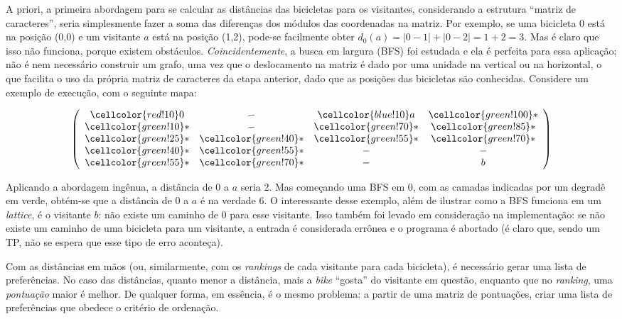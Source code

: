 \documentclass{article}
\newcommand\bl{\cellcolor{blue!10}}
\newcommand\re{\cellcolor{red!10}}
\newcommand\ga{\cellcolor{green!10}}
\newcommand\gb{\cellcolor{green!25}}
\newcommand\gc{\cellcolor{green!40}}
\newcommand\gd{\cellcolor{green!55}}
\newcommand\gf{\cellcolor{green!70}}
\newcommand\gh{\cellcolor{green!85}}
\newcommand\gi{\cellcolor{green!100}}
\begin{document}
A priori, a primeira abordagem para se calcular as distâncias das bicicletas para os visitantes, considerando a estrutura ``matriz de caracteres'', seria simplesmente fazer a soma das diferenças dos módulos das coordenadas na matriz. Por exemplo, se uma bicicleta 0 está na posição (0,0) e um visitante \( a \) está na posição (1,2), pode-se facilmente obter \( d_{0}(a) = |0-1| + |0-2| = 1 + 2 = 3 \). Mas é claro que isso não funciona, porque existem obstáculos. \textit{Coincidentemente}, a busca em largura (BFS) foi estudada e ela é perfeita para essa aplicação; não é nem necessário construir um grafo, uma vez que o deslocamento na matriz é dado por uma unidade na vertical ou na horizontal, o que facilita o uso da própria matriz de caracteres da etapa anterior, dado que as posições das bicicletas são conhecidas. Considere um exemplo de execução, com o seguinte mapa:

\begin{equation}\label{eq:appendrow}
	\left(\begin{array}{cccc}
			\re 0 & -     & \bl a & \gi * \\
			\ga * & -     & \gf * & \gh * \\
			\gb * & \gc * & \gd * & \gf * \\
			\gc * & \gd * & -     & -     \\
			\gd * & \gf * & -     & b     \\
		\end{array}\right)
\end{equation}

Aplicando a abordagem ingênua, a distância de 0 a \( a \) seria 2. Mas começando uma BFS em 0, com as camadas indicadas por um degradê em verde, obtém-se que a distância de 0 a \( a \) é na verdade 6. O interessante desse exemplo, além de ilustrar como a BFS funciona em um \textit{lattice}, é o visitante \( b \): não existe um caminho de 0 para esse visitante. Isso também foi levado em consideração na implementação: se não existe um caminho de uma bicicleta para um visitante, a entrada é considerada errônea e o programa é abortado (é claro que, sendo um TP, não se espera que esse tipo de erro aconteça).

Com as distâncias em mãos (ou, similarmente, com os \textit{rankings} de cada visitante para cada bicicleta), é necessário gerar uma lista de preferências. No caso das distâncias, quanto menor a distância, mais a \textit{bike} ``gosta'' do visitante em questão, enquanto que no \textit{ranking}, uma \textit{pontuação} maior é melhor. De qualquer forma, em essência, é o mesmo problema: a partir de uma matriz de pontuações, criar uma lista de preferências que obedece o critério de ordenação.
\end{document}
